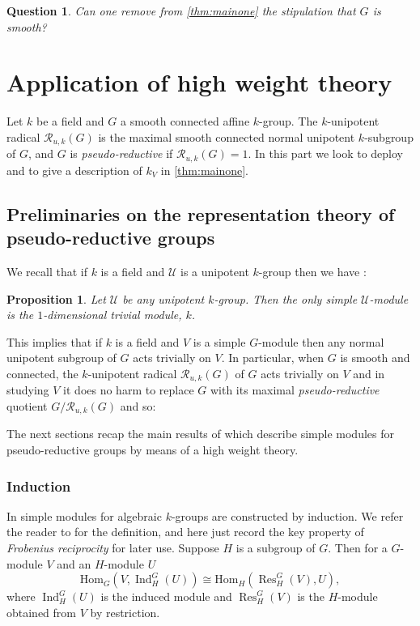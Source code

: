 \documentclass[11pt,reqno]{amsart}
\newtheorem{prop}[lemma]{Proposition}
\newtheorem{question}[lemma]{Question}
\theoremstyle{definition}
\theoremstyle{remark}
\theoremstyle{definition}
\theoremstyle{plain}
\DeclareMathOperator{\Res}{Res}
\DeclareMathOperator{\Ind}{Ind}
\newcommand{\RR}{\mathscr{R}}
\newcommand{\Hom}{\mathrm{Hom}}
\newcommand{\U}{\mathscr{U}}
\begin{document}
\begin{question}Can one remove from \cref{thm:mainone} the stipulation that $G$ is smooth?\end{question}



\section{Application of high weight theory}\label{partii}
Let $k$ be a field and $G$ a smooth connected affine $k$-group. The $k$-unipotent radical $\RR_{u,k}(G)$ is the maximal smooth connected normal unipotent $k$-subgroup of $G$, and $G$ is \emph{pseudo-reductive} if
$\RR_{u,k}(G) = 1$. In this part we look to deploy \cite{BS22} and \cite{CPClass} to give a description of $k_V$ in \cref{thm:mainone}. 

\subsection{Preliminaries on the representation theory of pseudo-reductive groups}
We recall that if $k$ is a field and $\U$ is a unipotent $k$-group then we have \cite[Exp.XVII, Prop.~3.2]{SGA3}:
\begin{prop}\label{unipsimp}Let $\U$ be any unipotent $k$-group. Then the only simple $\U$-module is the $1$-dimensional trivial module, $k$.\end{prop}

This implies that if $k$ is a field and $V$ is a simple $G$-module then any normal unipotent subgroup of $G$ acts trivially on $V$. In particular, when $G$ is smooth and connected, the $k$-unipotent radical $\RR_{u,k}(G)$ of $G$ acts trivially on $V$ and in studying $V$ it does no harm to replace $G$ with its maximal \emph{pseudo-reductive} quotient $G/\RR_{u,k}(G)$ and so:

\begin{center}\end{center}

The next sections recap the main results of \cite{BS22} which describe simple modules for pseudo-reductive groups by means of a high weight theory. 

\subsubsection{Induction} 
In \cite{BS22} simple modules for algebraic $k$-groups are constructed by induction.
We refer the reader to \cite[I.3.3]{Jan03} for the definition, and here just record the key property of \emph{Frobenius reciprocity}  \cite[I.3.4(b)]{Jan03}
for later use. 
Suppose $H$ is a subgroup of $G$. Then for a $G$-module $V$ and an $H$-module $U$
\begin{equation}\label{eq:frob}
\Hom_G(V,\Ind_H^G(U)) \cong \Hom_H(\Res^G_H(V),U),
\end{equation}
where $\Ind_H^G(U)$ is the induced module and $\Res^G_H(V)$ is the $H$-module obtained from $V$ by restriction.
\end{document}
